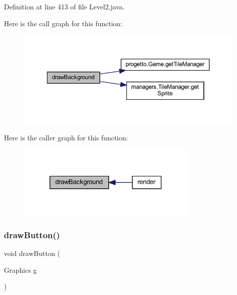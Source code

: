 Definition at line 413 of file Level2.\+java.

Here is the call graph for this function\+:\nopagebreak
\begin{figure}[H]
\begin{center}
\leavevmode
\includegraphics[width=350pt]{classscenes_1_1_level2_a62bcb07be9e39896e5837a9d396e7235_cgraph}
\end{center}
\end{figure}
Here is the caller graph for this function\+:\nopagebreak
\begin{figure}[H]
\begin{center}
\leavevmode
\includegraphics[width=249pt]{classscenes_1_1_level2_a62bcb07be9e39896e5837a9d396e7235_icgraph}
\end{center}
\end{figure}
\mbox{\label{classscenes_1_1_level2_a65768678909bc0512c6cb9780709ad38}} 
\subsubsection{\texorpdfstring{draw\+Button()}{drawButton()}}
{\footnotesize\ttfamily void draw\+Button (\begin{DoxyParamCaption}\item[{Graphics}]{g }\end{DoxyParamCaption})\hspace{0.3cm}{\ttfamily [private]}}



